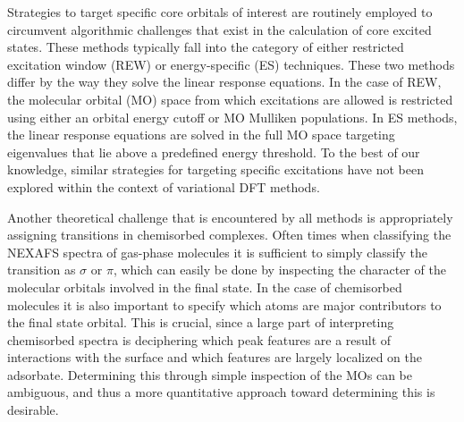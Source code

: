 \documentclass{article}
\begin{document}
%
%


Strategies to target specific core orbitals of interest are routinely employed to circumvent algorithmic challenges that exist in the calculation of core excited states. These methods typically fall into the category of either restricted excitation window (REW) \cite{stener_time_2003,besley_time-dependent_2010,lopata_linear-response_2012} or energy-specific (ES) techniques. \cite{lestrange_calibration_2015,peng_energy-specific_2015}  These two methods differ by the way they solve the linear response equations. In the case of REW, the molecular orbital (MO) space from which excitations are allowed is restricted  using either an orbital energy cutoff or MO Mulliken populations. In ES methods, the linear response equations are solved in the full MO space targeting eigenvalues that lie above a predefined energy threshold. To the best of our knowledge, similar strategies for targeting specific excitations have not been explored within the context of variational DFT methods. 

Another theoretical challenge that is encountered by all methods is appropriately assigning transitions in chemisorbed complexes. Often times when classifying the NEXAFS spectra of gas-phase molecules it is sufficient to simply classify the transition as $\sigma$ or $\pi$, which can easily be done by inspecting the character of the molecular orbitals involved in the final state. In the case of chemisorbed molecules it is also important to specify which atoms are major contributors to the final state orbital. This is crucial, since a large part of interpreting chemisorbed spectra is deciphering which peak features are a result of interactions with the surface and which features are largely localized on the adsorbate. Determining this through simple inspection of the MOs can be ambiguous, and thus a more quantitative approach toward determining this is desirable.
\end{document}

